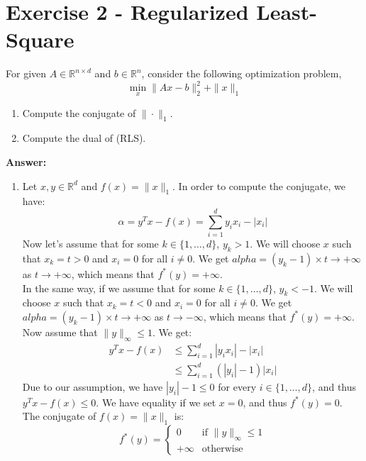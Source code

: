 \documentclass[11pt,a4paper]{article}
\newenvironment{solution}{
  \par\noindent\textbf{Answer:}\vspace{0.3em}
}{\vspace{1em}}
\begin{document}
\newpage
\section{Exercise 2 - Regularized Least-Square}
For given $A \in \mathbb{R}^{n \times d}$ and $b \in \mathbb{R}^{n}$, consider the following optimization problem,
\begin{equation} \tag{RLS}
\min_{x} \|Ax-b\|_{2}^{2} + \|x\|_{1}
\end{equation}
\begin{enumerate}
    \item Compute the conjugate of $\|\cdot\|_{1}$.
    \item Compute the dual of (RLS).
\end{enumerate}

\begin{solution}
    \begin{enumerate}
        \item Let $x, y \in \mathbb{R}^d$ and $f(x) = \|x\|_1$. In order to compute the conjugate, we have:$$\alpha = y^T x - f(x) = \sum_{i=1}^{d} y_i x_i - |x_i|$$
        Now let's assume that for some $k \in \{1, \dots, d\}$, $y_k > 1$. We will choose $x$ such that $x_k = t > 0$ and $x_i = 0$ for all $i \neq 0$. We get $alpha = (y_k - 1) \times t \to +\infty$ as $t \to +\infty$, which means that $f^*(y) = +\infty$.\\
        In the same way, if we assume that for some $k \in \{1, \dots, d\}$, $y_k < -1$. We will choose $x$ such that $x_k = t < 0$ and $x_i = 0$ for all $i \neq 0$. We get $alpha = (y_k - 1) \times t \to +\infty$ as $t \to -\infty$, which means that $f^*(y) = +\infty$.\\
        Now assume that $\|y\|_\infty \leq 1$. We get:$$\begin{aligned}
            y^T x - f(x)
            &\leq \sum_{i=1}^d |y_i x_i| - |x_i|\\
            &\leq \sum_{i=1}^d (|y_i| - 1) |x_i|
        \end{aligned}$$
        Due to our assumption, we have $|y_i| - 1 \leq 0$ for every $i \in \{1, \dots, d\}$, and thus $y^T x - f(x) \leq 0$. We have equality if we set $x = 0$, and thus $f^*(y) = 0$.\\
        The conjugate of $f(x) = \|x\|_1$ is: $$f^*(y) = \begin{cases}
            0 &\text{if } \|y\|_\infty \leq 1\\
            +\infty &\text{otherwise}
        \end{cases}$$




\end{enumerate}
\end{solution}
\end{document}
